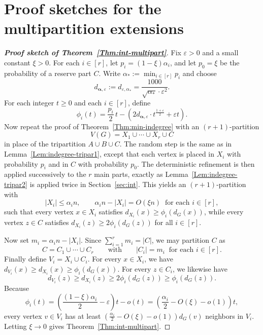 \documentclass{aic}
\begin{document}
	\section{Proof sketches for the multipartition extensions}\label{Sec:App-multipart}
	
	\begin{proof}[\bf Proof sketch of Theorem~\ref{Thm:int-multipart}]
		Fix $\varepsilon>0$ and a small constant $\xi>0$.
		For each $i\in [r]$, let $p_i=(1-\xi)\alpha_i$, and let $p_0=\xi$ be the probability of a reserve part $C$.
		Write $\alpha_*:=\min_{i\in [r]} p_i$ and choose
		$$d_{\boldsymbol{\alpha},\varepsilon}:=d_{\varepsilon,\alpha_*}=\frac{1000}{\sqrt{\alpha_*}\cdot \varepsilon^2}.$$
		For each integer $t\ge 0$ and each $i\in [r]$, define
		\[
		\phi_i(t)=\frac{p_i}{2}\,t-\left(2d_{\boldsymbol{\alpha},\varepsilon}\cdot t^{\frac{1+\varepsilon}{2}}+\varepsilon t\right).
		\]
		Now repeat the proof of Theorem~\ref{Thm:min-indegree} with an $(r+1)$-partition
		\[V(G)=X_1\cup \cdots \cup X_r\cup C\]
		in place of the tripartition $A\cup B\cup C$.
		The random step is the same as in Lemma~\ref{Lem:indegree-tripar1}, except that each vertex is placed in $X_i$ with probability $p_i$ and in $C$ with probability $p_0$.
		The deterministic refinement is then applied successively to the $r$ main parts, exactly as Lemma~\ref{Lem:indegree-tripar2} is applied twice in Section~\ref{sec:int}.
		This yields an $(r+1)$-partition with
		\[
		|X_i|\le \alpha_i n,\qquad \alpha_i n-|X_i|=O(\xi n)\ \text{ for each } i\in [r],
		\]
		such that every vertex $x\in X_i$ satisfies $d_{X_i}(x)\ge \phi_i(d_G(x))$, while every vertex $z\in C$ satisfies $d_{X_i}(z)\ge 2\phi_i(d_G(z))$ for all $i\in [r]$.
		
		Now set $m_i=\alpha_i n-|X_i|$.
		Since $\sum_{i=1}^r m_i=|C|$, we may partition $C$ as
		\[C=C_1\cup \cdots \cup C_r\qquad\text{with}\qquad |C_i|=m_i\ \text{ for each } i\in [r].\]
		Finally define $V_i=X_i\cup C_i$.
		For every $x\in X_i$, we have $d_{V_i}(x)\ge d_{X_i}(x)\ge \phi_i(d_G(x))$.
		For every $z\in C_i$, we likewise have
		\[d_{V_i}(z)\ge d_{X_i}(z)\ge 2\phi_i(d_G(z))\ge \phi_i(d_G(z)).\]
		Because
		\[
		\phi_i(t)=\left(\frac{(1-\xi)\alpha_i}{2}-\varepsilon\right)t-o(t)=\left(\frac{\alpha_i}{2}-O(\xi)-o(1)\right)t,
		\]
		every vertex $v\in V_i$ has at least $\left(\frac{\alpha_i}{2}-O(\xi)-o(1)\right)d_G(v)$ neighbors in $V_i$.
		Letting $\xi\to 0$ gives Theorem~\ref{Thm:int-multipart}.
	\end{proof}
	
\end{document}
